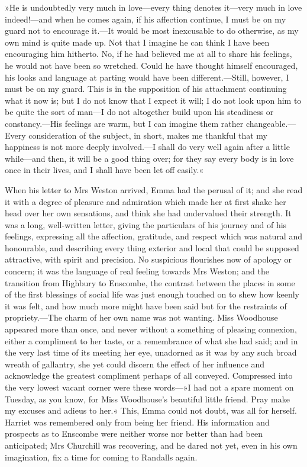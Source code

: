 »He is undoubtedly very much in love—every thing denotes it—very much in love indeed!—and when he comes again, if his affection continue, I must be on my guard not to encourage it.—It would be most inexcusable to do otherwise, as my own mind is quite made up. Not that I imagine he can think I have been encouraging him hitherto. No, if he had believed me at all to share his feelings, he would not have been so wretched. Could he have thought himself encouraged, his looks and language at parting would have been different.—Still, however, I must be on my guard. This is in the supposition of his attachment continuing what it now is; but I do not know that I expect it will; I do not look upon him to be quite the sort of man—I do not altogether build upon his steadiness or constancy.—His feelings are warm, but I can imagine them rather changeable.—Every consideration of the subject, in short, makes me thankful that my happiness is not more deeply involved.—I shall do very well again after a little while—and then, it will be a good thing over; for they say every body is in love once in their lives, and I shall have been let off easily.«

When his letter to Mrs Weston arrived, Emma had the perusal of it; and she read it with a degree of pleasure and admiration which made her at first shake her head over her own sensations, and think she had undervalued their strength. It was a long, well-written letter, giving the particulars of his journey and of his feelings, expressing all the affection, gratitude, and respect which was natural and honourable, and describing every thing exterior and local that could be supposed attractive, with spirit and precision. No suspicious flourishes now of apology or concern; it was the language of real feeling towards Mrs Weston; and the transition from Highbury to Enscombe, the contrast between the places in some of the first blessings of social life was just enough touched on to shew how keenly it was felt, and how much more might have been said but for the restraints of propriety.—The charm of her own name was not wanting. Miss Woodhouse appeared more than once, and never without a something of pleasing connexion, either a compliment to her taste, or a remembrance of what she had said; and in the very last time of its meeting her eye, unadorned as it was by any such broad wreath of gallantry, she yet could discern the effect of her influence and acknowledge the greatest compliment perhaps of all conveyed. Compressed into the very lowest vacant corner were these words—»I had not a spare moment on Tuesday, as you know, for Miss Woodhouse's beautiful little friend. Pray make my excuses and adieus to her.« This, Emma could not doubt, was all for herself. Harriet was remembered only from being her friend. His information and prospects as to Enscombe were neither worse nor better than had been anticipated; Mrs Churchill was recovering, and he dared not yet, even in his own imagination, fix a time for coming to Randalls again.

